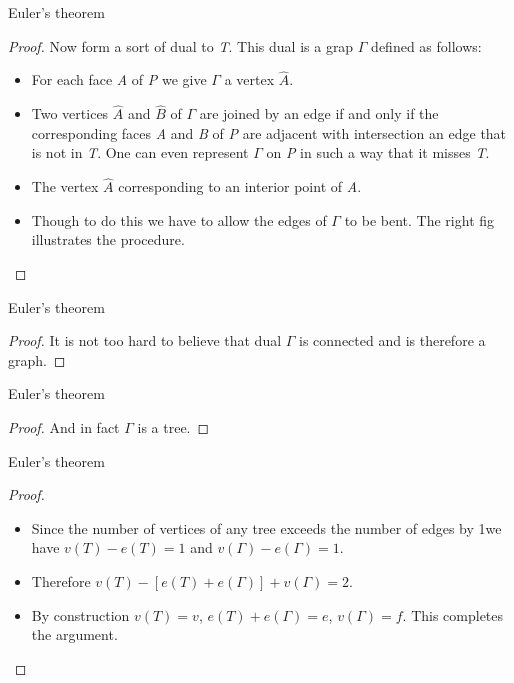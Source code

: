\documentclass{beamer}
\begin{document}
\begin{frame}{Euler's theorem}
  \begin{proof}
    Now form a sort of dual to \textsl{T}. This dual is a grap $\Gamma$ defined as follows:
    \begin{itemize}
    \item For each face \textsl{A} of \textsl{P} we give $\Gamma$ a vertex $\hat A$.
    \item Two vertices $\hat A$ and $\hat B$ of $\Gamma$ are joined by an edge if and only if the corresponding faces \textsl{A} and \textsl{B} of \textsl{P} are adjacent with intersection an edge that is not in \textsl{T}. One can even represent $\Gamma$ on \textsl{P} in such a way that it misses \textsl{T}.
    \item The vertex $\hat A$ corresponding to an interior point of \textsl{A}.
    \item Though to do this we have to allow the edges of $\Gamma$ to be bent. The right fig illustrates the procedure.
    \end{itemize}
  \end{proof}
\end{frame}

\begin{frame}{Euler's theorem}
  \begin{proof}
    It is not too hard to believe that dual $\Gamma$ is connected and is therefore a graph.
  \end{proof}
\end{frame}

\begin{frame}{Euler's theorem}
  \begin{proof}
    And in fact $\Gamma$ is a tree.
  \end{proof}
\end{frame}

\begin{frame}{Euler's theorem}
      \begin{proof}
        \begin{itemize}
        \item Since the number of vertices of any tree exceeds the number of edges by 1we have $v(T) - e(T) = 1$ and $v(\Gamma) - e(\Gamma) = 1$.
        \item Therefore $v(T) - [e(T) + e(\Gamma)] + v(\Gamma) = 2$.
        \item By construction $v(T) = v$, $e(T) + e(\Gamma) = e$, $v(\Gamma) = f$. This completes the argument.
        \end{itemize}
      \end{proof}
\end{frame}
\end{document}
